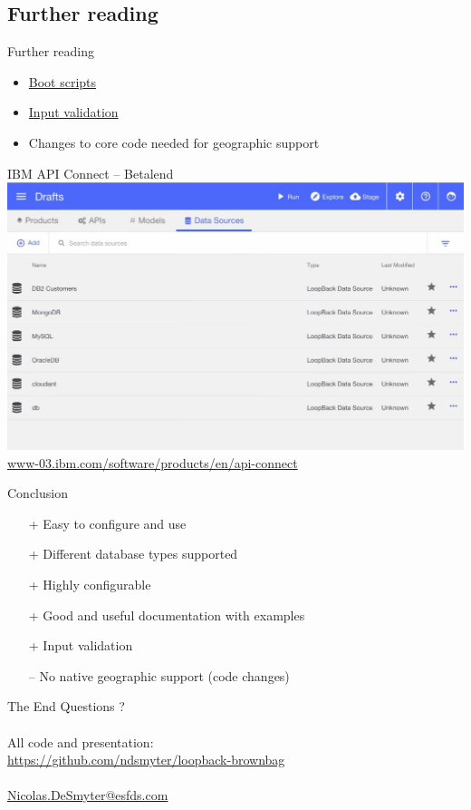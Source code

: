 \documentclass[11pt]{beamer}
\begin{document}
\subsection{Further reading}
\begin{frame}{Further reading}
\begin{itemize}
\item \hyperref[http://loopback.io/doc/en/lb3/Defining-boot-scripts.html]{Boot scripts}
\item \hyperref[http://loopback.io/doc/en/lb3/Validating-model-data.html]{Input validation}
\item Changes to core code needed for geographic support
\end{itemize}
\end{frame}
\begin{frame}{IBM API Connect}
-- Betalend
\includegraphics[width=\textwidth]{images/ibm-api-connect2.jpg}\\
\url{www-03.ibm.com/software/products/en/api-connect}
\end{frame}
\begin{frame}{Conclusion}
\begin{itemize}
\item[+] Easy to configure and use
\item[+] Different database types supported
\item[+] Highly configurable
\item[+] Good and useful documentation with examples
\item[+] Input validation
\item[--] No native geographic support (code changes)
\end{itemize}
\end{frame}
\begin{frame}{The End}
Questions ?\\
~\\
All code and presentation:\\
\url{https://github.com/ndsmyter/loopback-brownbag}\\
~\\
\hyperref[mailto:Nicolas.DeSmyter@esfds.com]{Nicolas.DeSmyter@esfds.com}
\end{frame}
\end{document}
